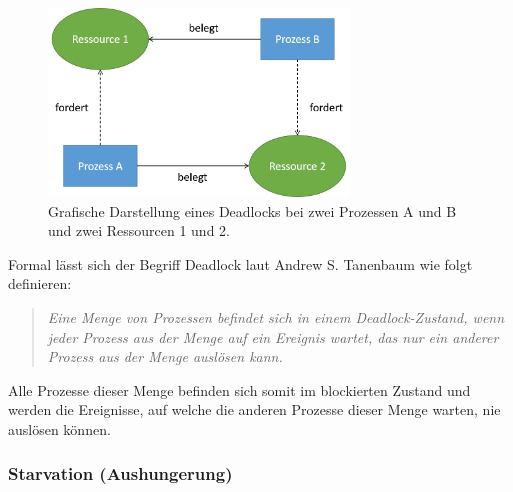 				\begin{figure}
					\centering	
					\includegraphics[width=8cm]{Abbildungen/Deadlock_Schema.png}
					\caption{Grafische Darstellung eines Deadlocks bei zwei Prozessen A und B und zwei Ressourcen 1 und 2.}
					\label{fig:DeadlockSchema}
				\end{figure}
			
				Formal lässt sich der Begriff Deadlock laut Andrew S. Tanenbaum wie folgt definieren:
				
				\begin{quote}
					\textit{Eine Menge von Prozessen befindet sich in einem Deadlock-Zustand, wenn jeder Prozess aus der Menge auf ein Ereignis wartet, das nur ein anderer Prozess aus der Menge auslösen kann. \cite{ModerneBetriebssysteme}}
				\end{quote}
				
				Alle Prozesse dieser Menge befinden sich somit im blockierten Zustand und werden die Ereignisse, auf welche die anderen Prozesse dieser Menge warten, nie auslösen können. \cite{ModerneBetriebssysteme}
								
			\subsubsection{Starvation (Aushungerung)}
			
